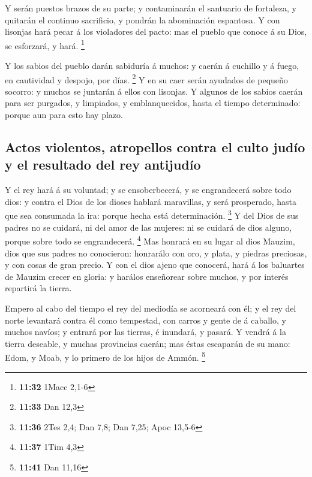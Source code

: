  Y serán puestos brazos de su parte; y contaminarán el
santuario de fortaleza, y quitarán el continuo sacrificio, y pondrán la
abominación espantosa.  Y con lisonjas hará pecar á los
violadores del pacto: mas el pueblo que conoce á su Dios, se esforzará,
y hará. \footnote{\textbf{11:32} 1Macc 2,1-6}

 Y los sabios del pueblo darán sabiduría á muchos: y caerán
á cuchillo y á fuego, en cautividad y despojo, por días. \footnote{\textbf{11:33}
  Dan 12,3}  Y en su caer serán ayudados de pequeño
socorro: y muchos se juntarán á ellos con lisonjas.  Y
algunos de los sabios caerán para ser purgados, y limpiados, y
emblanquecidos, hasta el tiempo determinado: porque aun para esto hay
plazo.

\hypertarget{actos-violentos-atropellos-contra-el-culto-juduxedo-y-el-resultado-del-rey-antijuduxedo}{%
\subsection{Actos violentos, atropellos contra el culto judío y el
resultado del rey
antijudío}\label{actos-violentos-atropellos-contra-el-culto-juduxedo-y-el-resultado-del-rey-antijuduxedo}}

 Y el rey hará á su voluntad; y se ensoberbecerá, y se
engrandecerá sobre todo dios: y contra el Dios de los dioses hablará
maravillas, y será prosperado, hasta que sea consumada la ira: porque
hecha está determinación. \footnote{\textbf{11:36} 2Tes 2,4; Dan 7,8;
  Dan 7,25; Apoc 13,5-6}  Y del Dios de sus padres no se
cuidará, ni del amor de las mujeres: ni se cuidará de dios alguno,
porque sobre todo se engrandecerá. \footnote{\textbf{11:37} 1Tim 4,3}
 Mas honrará en su lugar al dios Mauzim, dios que sus
padres no conocieron: honrarálo con oro, y plata, y piedras preciosas, y
con cosas de gran precio.  Y con el dios ajeno que
conocerá, hará á los baluartes de Mauzim crecer en gloria: y harálos
enseñorear sobre muchos, y por interés repartirá la tierra.

 Empero al cabo del tiempo el rey del mediodía se acorneará
con él; y el rey del norte levantará contra él como tempestad, con
carros y gente de á caballo, y muchos navíos; y entrará por las tierras,
é inundará, y pasará.  Y vendrá á la tierra deseable, y
muchas provincias caerán; mas éstas escaparán de su mano: Edom, y Moab,
y lo primero de los hijos de Ammón. \footnote{\textbf{11:41} Dan 11,16}

